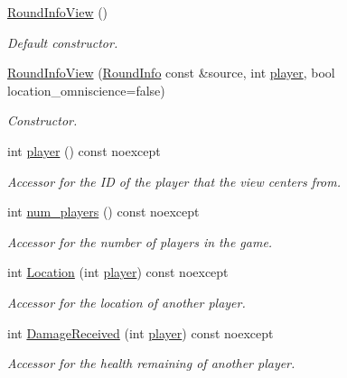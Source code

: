 \begin{DoxyCompactItemize}
\item 
\hyperlink{classroundinfo_1_1_round_info_view_a29937c9ac9cd71b7edd10f612ce76c91}{Round\+Info\+View} ()
\begin{DoxyCompactList}\small\item\em Default constructor. \end{DoxyCompactList}\item 
\hyperlink{classroundinfo_1_1_round_info_view_a8c5bca173f30cc869505c36baf04ebaa}{Round\+Info\+View} (\hyperlink{classroundinfo_1_1_round_info}{Round\+Info} const \&source, int \hyperlink{classroundinfo_1_1_round_info_view_acb1e4edcbe9b01f59ba26542f528ba24}{player}, bool location\+\_\+omniscience=false)
\begin{DoxyCompactList}\small\item\em Constructor. \end{DoxyCompactList}\item 
int \hyperlink{classroundinfo_1_1_round_info_view_acb1e4edcbe9b01f59ba26542f528ba24}{player} () const noexcept
\begin{DoxyCompactList}\small\item\em Accessor for the ID of the player that the view centers from. \end{DoxyCompactList}\item 
int \hyperlink{classroundinfo_1_1_round_info_view_af4d82c9aff1c4a27cba11740f6ac76ab}{num\+\_\+players} () const noexcept
\begin{DoxyCompactList}\small\item\em Accessor for the number of players in the game. \end{DoxyCompactList}\item 
int \hyperlink{classroundinfo_1_1_round_info_view_a05f42a982570552bbeb8c330e62437ad}{Location} (int \hyperlink{classroundinfo_1_1_round_info_view_acb1e4edcbe9b01f59ba26542f528ba24}{player}) const noexcept
\begin{DoxyCompactList}\small\item\em Accessor for the location of another player. \end{DoxyCompactList}\item 
int \hyperlink{classroundinfo_1_1_round_info_view_ac2d60e02ab84297d958b5b5caa653c7b}{Damage\+Received} (int \hyperlink{classroundinfo_1_1_round_info_view_acb1e4edcbe9b01f59ba26542f528ba24}{player}) const noexcept
\begin{DoxyCompactList}\small\item\em Accessor for the health remaining of another player. \end{DoxyCompactList}\item 

\end{DoxyCompactItemize}
